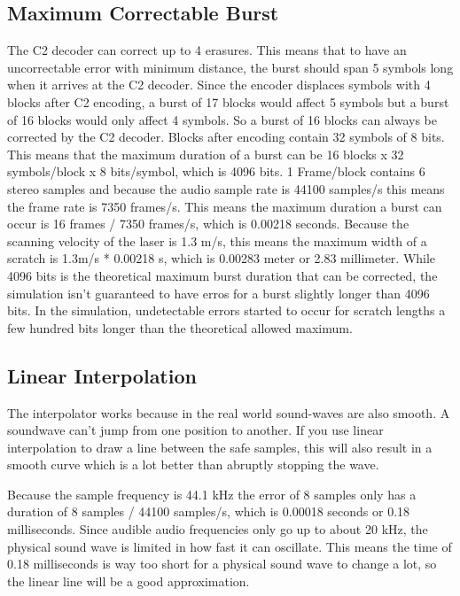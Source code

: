 \documentclass[11pt,a4paper]{article}
\begin{document}
\subsection{Maximum Correctable Burst}
The C2 decoder can correct up to 4 erasures. This means that to have an uncorrectable error with minimum distance, the burst should span 5 symbols long when it arrives at the C2 decoder. Since the encoder displaces symbols with 4 blocks after C2 encoding, a burst of 17 blocks would affect 5 symbols but a burst of 16 blocks would only affect 4 symbols. So a burst of 16 blocks can always be corrected by the C2 decoder. Blocks after encoding contain 32 symbols of 8 bits. This means that the maximum duration of a burst can be 16 blocks x 32 symbols/block x 8 bits/symbol, which is 4096 bits. 1 Frame/block contains 6 stereo samples and because the audio sample rate is 44100 samples/s this means the frame rate is 7350 frames/s. This means the maximum duration a burst can occur is 16 frames / 7350 frames/s, which is 0.00218 seconds. Because the scanning velocity of the laser is 1.3 m/s, this means the maximum width of a scratch is 1.3m/s * 0.00218 s, which is 0.00283 meter or 2.83 millimeter. While 4096 bits is the theoretical maximum burst duration that can be corrected, the simulation isn't guaranteed to have erros for a burst slightly longer than 4096 bits. In the simulation, undetectable errors started to occur for scratch lengths a few hundred bits longer than the theoretical allowed maximum. 
\subsection{Linear Interpolation}
The interpolator works because in the real world sound-waves are also smooth. A soundwave can't jump from one position to another. If you use linear interpolation to draw a line between the safe samples, this will also result in a smooth curve which is a lot better than abruptly stopping the wave.

Because the sample frequency is 44.1 kHz the error of 8 samples only has a duration of 8 samples / 44100 samples/s, which is 0.00018 seconds or 0.18 milliseconds. Since audible audio frequencies only go up to about 20 kHz, the physical sound wave is limited in how fast it can oscillate. This means the time of 0.18 milliseconds is way too short for a physical sound wave to change a lot, so the linear line will be a good approximation.
\end{document}
